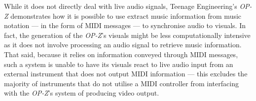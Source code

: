 \documentclass[../../initial_thesis.tex]{subfiles}
\begin{document}
While it does not directly deal with live audio signals, Teenage Engineering's \textit{OP-Z} demonstrates how it is possible to use extract music information from music notation --- in the form of MIDI messages --- to synchronise audio to visuals. In fact, the generation of the \textit{OP-Z}'s visuals might be less computationally intensive as it does not involve processing an audio signal to retrieve music information. That said, because it relies on information conveyed through MIDI messages, such a system is unable to have its visuals react to live audio input from an external instrument that does not output MIDI information --- this excludes the majority of instruments that do not utilise a MIDI controller from interfacing with the \textit{OP-Z}'s system of producing video output.

\end{document}

